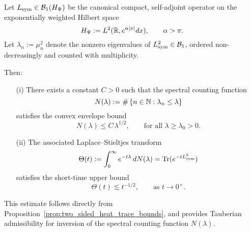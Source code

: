 \begin{lemma}
\label{lem:spectral_convexity_estimate}

Let \( L_{\mathrm{sym}} \in \mathcal{B}_1(H_{\Psi}) \) be the canonical compact, self-adjoint operator on the exponentially weighted Hilbert space
\[
H_{\Psi} := L^2(\mathbb{R}, e^{\alpha |x|} dx), \qquad \alpha > \pi.
\]
Let \( \lambda_n := \mu_n^2 \) denote the nonzero eigenvalues of \( L_{\mathrm{sym}}^2 \in \mathcal{B}_1 \), ordered non-decreasingly and counted with multiplicity.

Then:

\begin{enumerate}
  \item[\textup{(i)}] There exists a constant \( C > 0 \) such that the spectral counting function
  \[
  N(\lambda) := \#\left\{ n \in \mathbb{N} : \lambda_n \le \lambda \right\}
  \]
  satisfies the convex envelope bound
  \[
  N(\lambda) \le C\, \lambda^{1/2}, \qquad \text{for all } \lambda \ge \lambda_0 > 0.
  \]

  \item[\textup{(ii)}] The associated Laplace–Stieltjes transform
  \[
  \Theta(t) := \int_0^\infty e^{-t\lambda}\, dN(\lambda)
  = \operatorname{Tr}(e^{-t L_{\mathrm{sym}}^2})
  \]
  satisfies the short-time upper bound
  \[
  \Theta(t) \lesssim t^{-1/2}, \qquad \text{as } t \to 0^+.
  \]
\end{enumerate}

\noindent
This estimate follows directly from Proposition~\ref{prop:two_sided_heat_trace_bounds}, and provides Tauberian admissibility for inversion of the spectral counting function \( N(\lambda) \).
\end{lemma}
